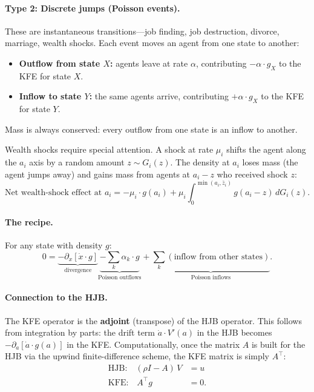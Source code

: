 \documentclass{article}
\begin{document}
\paragraph{Type 2: Discrete jumps (Poisson events).} These are instantaneous transitions---job finding, job destruction, divorce, marriage, wealth shocks. Each event moves an agent from one state to another:
\begin{itemize}
    \item \textbf{Outflow from state $X$:} agents leave at rate $\alpha$, contributing $-\alpha \cdot g_X$ to the KFE for state $X$.
    \item \textbf{Inflow to state $Y$:} the same agents arrive, contributing $+\alpha \cdot g_X$ to the KFE for state $Y$.
\end{itemize}
Mass is always conserved: every outflow from one state is an inflow to another.

Wealth shocks require special attention. A shock at rate $\mu_i$ shifts the agent along the $a_i$ axis by a random amount $z\sim G_i(z)$. The density at $a_i$ loses mass (the agent jumps away) and gains mass from agents at $a_i - z$ who received shock $z$:
\[
    \text{Net wealth-shock effect at } a_i = -\mu_i\cdot g(a_i) + \mu_i\int_0^{\min(a_i,\bar{z}_i)} g(a_i - z)\,dG_i(z).
\]

\paragraph{The recipe.} For any state with density $g$:
\[
    0 = \underbrace{-\partial_x[\dot{x}\cdot g]}_{\text{divergence}} \underbrace{- \textstyle\sum_k \alpha_k\cdot g}_{\text{Poisson outflows}} + \underbrace{\textstyle\sum_k (\text{inflow from other states})}_{\text{Poisson inflows}}.
\]

\paragraph{Connection to the HJB.} The KFE operator is the \textbf{adjoint} (transpose) of the HJB operator. This follows from integration by parts: the drift term $\dot{a}\cdot V'(a)$ in the HJB becomes $-\partial_a[\dot{a}\cdot g(a)]$ in the KFE. Computationally, once the matrix $A$ is built for the HJB via the upwind finite-difference scheme, the KFE matrix is simply $A^\top$:
\begin{align*}
    \text{HJB:} \quad (\rho I - A)\,V &= u \\
    \text{KFE:} \quad A^\top g &= 0.
\end{align*}
\end{document}
